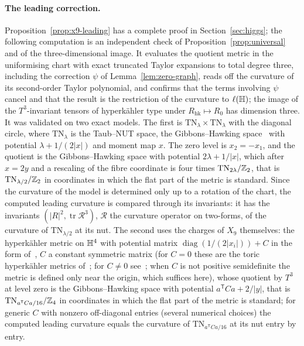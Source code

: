 \paragraph{The leading correction.}
Proposition~\ref{prop:x9-leading} has a complete proof in Section~\ref{sec:higgs}; the following computation
is an independent check of Proposition~\ref{prop:universal} and of the three-dimensional image. It evaluates the quotient metric in the
uniformising chart with exact truncated Taylor expansions to total degree three, including the correction $\psi$
of Lemma~\ref{lem:zero-graph}, reads off the curvature of its second-order Taylor polynomial, and confirms
that the terms involving $\psi$ cancel and that the result is the restriction of the curvature to
$\ell(\mathbb H)$; the image of the $T^3$-invariant tensors of hyperk\"ahler type under $R_{\mathrm{hk}}\mapsto R_0$ has dimension
three. It was
validated on two exact models. The first is $\mathrm{TN}_\lambda\times\mathrm{TN}_\lambda$ with the diagonal
circle, where $\mathrm{TN}_\lambda$ is the Taub--NUT space, the Gibbons--Hawking space~\cite{GibbonsHawking:1978}
with potential $\lambda+1/(2|x|)$ and moment map $x$. The zero level is $x_2=-x_1$, and the quotient is the
Gibbons--Hawking space with potential $2\lambda+1/|x|$, which after $x=2y$ and a rescaling of the fibre
coordinate is four times $\mathrm{TN}_{2\lambda}/\mathbb Z_2$, that is $\mathrm{TN}_{\lambda/2}/\mathbb Z_2$ in coordinates in which
the flat part of the metric is standard. Since the curvature of the model is determined only up to a rotation of the chart, the computed leading
curvature is compared through its invariants: it has the invariants
$(|R|^2,\operatorname{tr}\mathcal R^3)$, $\mathcal R$ the curvature operator on two-forms, of the curvature of
$\mathrm{TN}_{\lambda/2}$ at its nut. The second uses the charges of $X_9$ themselves: the hyperk\"ahler
metric on $\mathbb H^4$ with potential matrix $\operatorname{diag}(1/(2|x_i|))+C$ in the form
of~\cite{PedersenPoon:1988}, $C$ a constant symmetric matrix (for $C=0$ these are the toric hyperk\"ahler
metrics of~\cite{BielawskiDancer:2000}; for $C\neq0$ see~\cite{GibbonsRychenkovaGoto:1997,Bielawski:1999};
when $C$ is not positive semidefinite the metric is defined only near the origin, which suffices here), whose quotient by $T^3$ at level zero
is the Gibbons--Hawking space with potential $a^{\mathsf T}Ca+2/|y|$, that is
$\mathrm{TN}_{a^{\mathsf T}Ca/16}/\mathbb Z_4$ in coordinates in which the flat part of the metric is standard; for generic $C$ with nonzero off-diagonal
entries (several numerical choices) the computed leading curvature equals the curvature of
$\mathrm{TN}_{a^{\mathsf T}Ca/16}$ at its nut entry by entry.
